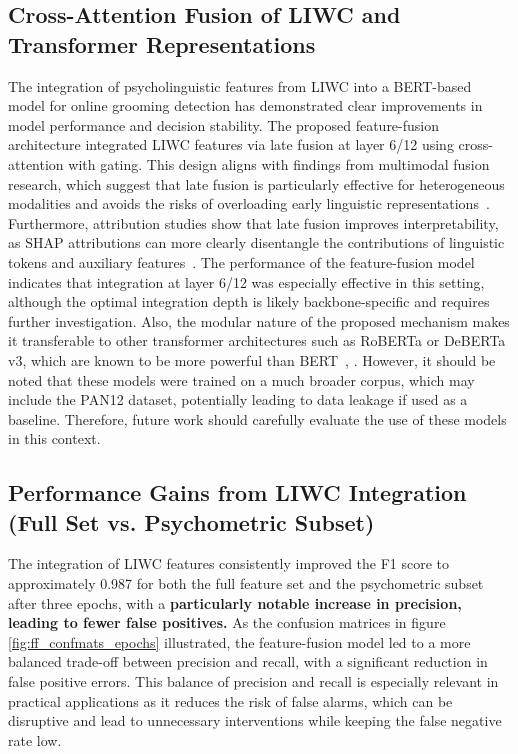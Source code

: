 \subsection{Cross-Attention Fusion of LIWC and Transformer Representations}

The integration of psycholinguistic features from LIWC into a BERT-based model for online grooming detection has demonstrated clear improvements in model performance and decision stability. The proposed feature-fusion architecture integrated LIWC features via late fusion at layer 6/12 using cross-attention with gating. This design aligns with findings from multimodal fusion research, which suggest that late fusion is particularly effective for heterogeneous modalities and avoids the risks of overloading early linguistic representations~\cite{shankar2022progressivefusion}. Furthermore, attribution studies show that late fusion improves interpretability, as SHAP attributions can more clearly disentangle the contributions of linguistic tokens and auxiliary features~\cite{shapcat2024interpretable}. The performance of the feature-fusion model indicates that integration at layer 6/12 was especially effective in this setting, although the optimal integration depth is likely backbone-specific and requires further investigation. Also, the modular nature of the proposed mechanism makes it transferable to other transformer architectures such as RoBERTa or DeBERTa v3, which are known to be more powerful than BERT~\cite{liu2019roberta}, \cite{he2023debertav3}. However, it should be noted that these models were trained on a much broader corpus, which may include the PAN12 dataset, potentially leading to data leakage if used as a baseline. Therefore, future work should carefully evaluate the use of these models in this context.

\subsection{Performance Gains from LIWC Integration (Full Set vs. Psychometric Subset)}

The integration of LIWC features consistently improved the F1 score to approximately 0.987 for both the full feature set and the psychometric subset after three epochs, with a \textbf{particularly notable increase in precision, leading to fewer false positives.} As the confusion matrices in figure \ref{fig:ff_confmats_epochs} illustrated, the feature-fusion model led to a more balanced trade-off between precision and recall, with a significant reduction in false positive errors. This balance of precision and recall is especially relevant in practical applications as it reduces the risk of false alarms, which can be disruptive and lead to unnecessary interventions while keeping the false negative rate low. 

